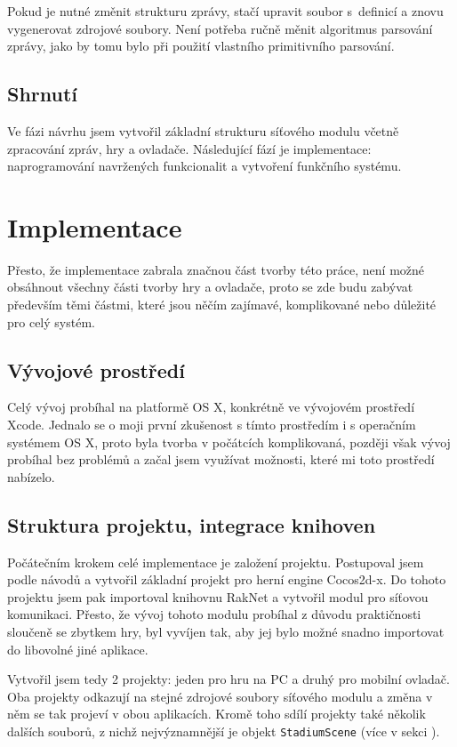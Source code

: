 \documentclass[thesis=B,czech,hidelinks]{FITthesis}[2012/06/26] %
\newcommand{\code}[1]{\texttt{#1}}
\begin{document}
Pokud je nutné změnit strukturu zprávy, stačí upravit soubor s~definicí a znovu vygenerovat zdrojové soubory. Není potřeba ručně měnit algoritmus parsování zprávy, jako by tomu bylo při použití vlastního primitivního parsování.

\subsection{Shrnutí}

Ve fázi návrhu jsem vytvořil základní strukturu síťového modulu včetně zpracování zpráv, hry a ovladače. Následující fází je implementace: naprogramování navržených funkcionalit a vytvoření funkčního systému.

\section{Implementace}

Přesto, že implementace zabrala značnou část tvorby této práce, není možné obsáhnout všechny části tvorby hry a ovladače, proto se zde budu zabývat především těmi částmi, které jsou něčím zajímavé, komplikované nebo důležité pro celý systém.

\subsection{Vývojové prostředí}

Celý vývoj probíhal na platformě OS X, konkrétně ve vývojovém prostředí Xcode. Jednalo se o moji první zkušenost s tímto prostředím i s operačním systémem OS X, proto byla tvorba v počátcích komplikovaná, později však vývoj probíhal bez problémů a začal jsem využívat možnosti, které mi toto prostředí nabízelo.

\subsection{Struktura projektu, integrace knihoven}

Počátečním krokem celé implementace je založení projektu. Postupoval jsem podle návodů a vytvořil základní projekt pro herní engine Cocos2d-x. Do tohoto projektu jsem pak importoval knihovnu RakNet a vytvořil modul pro síťovou komunikaci. Přesto, že vývoj tohoto modulu probíhal z důvodu praktičnosti sloučeně se zbytkem hry, byl vyvíjen tak, aby jej bylo možné snadno importovat do libovolné jiné aplikace.

Vytvořil jsem tedy 2 projekty: jeden pro hru na PC a druhý pro mobilní ovladač. Oba projekty odkazují na stejné zdrojové soubory síťového modulu a změna v něm se tak projeví v obou aplikacích. Kromě toho sdílí projekty také několik dalších souborů, z nichž nejvýznamnější je objekt \code{StadiumScene} (více v sekci ).
\end{document}
